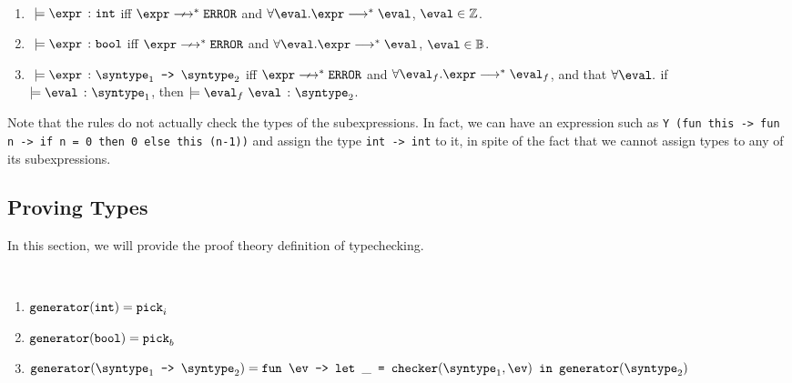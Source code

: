 \begin{definition}
  \label{def_typingM}
  \ \par
  \begin{enumerate}
      \item $\ \models \hastype{\expr}{\tint}$ iff $\expr \nsmallsteps[] \eerror$ and $\forall \eval. \expr \smallsteps[] \eval$, $\eval \in \mathbb{Z}$.
      \item $\ \models \hastype{\expr}{\tbool}$ iff $\expr \nsmallsteps[] \eerror$ and $\forall \eval.\expr \smallsteps[] \eval$, $\eval \in \mathbb{B}$.
      \item $\ \models \hastype{\expr}{\mkfun{\syntype_1}{\syntype_2}}$ iff $\expr \nsmallsteps[] \eerror$ and $\forall \eval_f.\expr \smallsteps[] \eval_f$, and that $\forall{\eval}.$ if $\models \hastype{\eval}{\syntype_1}$, then $\models \hastype{\eval_f\ \eval}{\syntype_2}$.
   \end{enumerate}
\end{definition}

Note that the rules do not actually check the types of the subexpressions. In 
fact, we can have an expression such as \texttt{Y}\ 
\texttt{(fun this -> fun n -> if n = 0 then 0 else this (n-1))} and 
assign the type \texttt{int -> int} to it, in spite of the fact that
we cannot assign types to any of its subexpressions.

\subsection{Proving Types}

In this section, we will provide the proof theory definition of typechecking.

\begin{definition}
  \label{def_genCore}
  \ \par 
  \begin{enumerate}
    \item $\texttt{generator}(\texttt{int}) = \texttt{pick}_i$
    \item $\texttt{generator}(\texttt{bool}) = \texttt{pick}_b$
    \item $\mkgen{\mkfun{\syntype_1}{\syntype_2}} = \mkfunv{\ev}{\letin{\_}{\mkche{\syntype_1}{\ev}}{\mkgen{\syntype_2}}}$
  \end{enumerate}
\end{definition}

